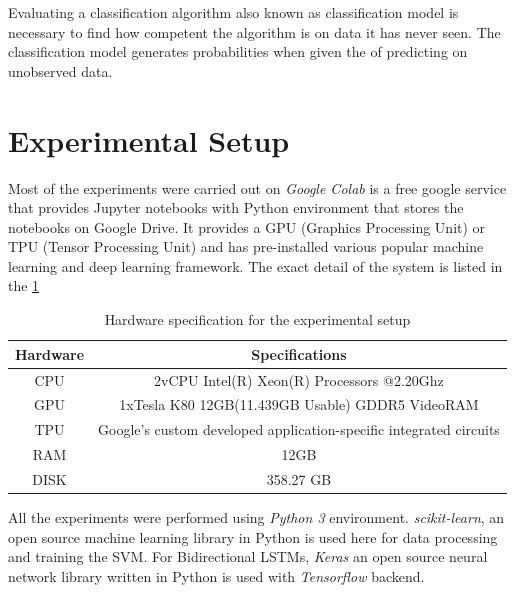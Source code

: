 \label{ch:evaluation}

Evaluating a classification algorithm also known as classification model is necessary to find how competent the algorithm is on data it has never seen. The classification model generates probabilities when given the of predicting on unobserved data. 

\section{Experimental Setup}
Most of the experiments were carried out on \textit{Google Colab} is a free google service that provides Jupyter notebooks with Python environment that stores the notebooks on Google Drive. It provides a GPU (Graphics Processing Unit) or TPU (Tensor Processing Unit) and has pre-installed various popular machine learning and deep learning framework. The exact detail of the system is listed in the \ref{table:HWsetup}

\begin{table}[!ht]
\centering
\begin{tabular}{cc}
\hline
\textbf{Hardware} & \textbf{Specifications} \\ \hline
CPU & 2vCPU Intel(R) Xeon(R) Processors @2.20Ghz \\
GPU & 1xTesla K80 12GB(11.439GB Usable) GDDR5  VideoRAM \\
TPU & \multicolumn{1}{l}{Google's custom developed application-specific integrated circuits} \\
RAM & 12GB \\
DISK & 358.27 GB \\ \hline
\end{tabular}
\caption{Hardware specification for the experimental setup}
\label{table:HWsetup}
\end{table}

All the experiments were performed using \textit{Python 3} environment. \textit{scikit-learn}, an open source machine learning library in Python is used here for data processing and training the SVM. For Bidirectional LSTMs, \textit{Keras} an open source neural network library written in Python is used with \textit{Tensorflow} backend.  

